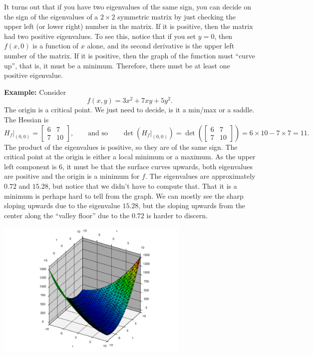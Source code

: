 \documentclass[12pt]{article}
\begin{document}
It turns out that if you have two eigenvalues of the same sign, you can
decide on the sign of the eigenvalues of a $2 \times 2$ symmetric matrix by just
checking the upper left (or lower right) number in the matrix.  If it is
positive, then the matrix had two positive eigenvalues.  To see this,
notice that if you set $y=0$, then $f(x,0)$ is a
function of $x$ alone, and its second derivative is the upper left number of
the matrix.  If it is positive, then the graph of the function must ``curve
up'', that is, it must be a minimum.  Therefore, there must be at least one
positive eigenvalue.

\bigskip

\pagebreak[2]
\textbf{Example:}  Consider
$$
f(x,y) = 3 x^2 + 7xy  + 5y^2 .
$$
The origin is a critical point.
We just need to decide, is it a min/max or a
saddle.
The Hessian is
$$
H_f \big|_{(0,0)} =
\begin{bmatrix}
6 & 7 \\
7 & 10
\end{bmatrix}
,
\qquad
\text{and so}
\qquad
\det(H_f\big|_{(0,0)}) = 
\det \left(
\begin{bmatrix}
6 & 7 \\
7 & 10
\end{bmatrix}
\right)
=
6 \times 10 - 7 \times 7 = 11 .
$$
The product of the eigenvalues is positive, so they are of the same sign.
The critical point at the origin is either a local minimum or a maximum.
As the upper left component is 6, it must be that the surface curves
upwards, both eigenvalues are positive and the origin is a minimum for $f$.
The eigenvalues are approximately $0.72$ and $15.28$, but notice
that we didn't have to compute that.  That it is a minimum is perhaps
hard to tell from the graph.  We can mostly see the sharp sloping upwards
due to the eigenvalue $15.28$, but the sloping upwards from the center along
the ``valley floor'' due to the $0.72$ is harder to discern.
\nopagebreak
\begin{center}
\includegraphics[width=3.65in]{all-upwards.pdf}
\end{center}
\end{document}
